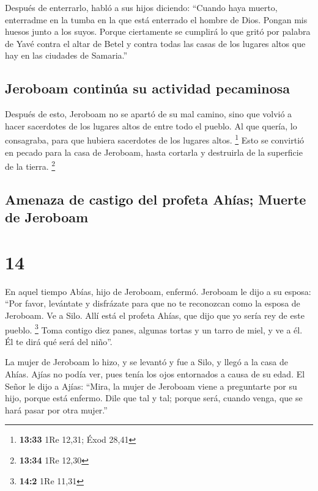  Después de enterrarlo, habló a sus hijos diciendo:
``Cuando haya muerto, enterradme en la tumba en la que está enterrado el
hombre de Dios. Pongan mis huesos junto a los suyos. 
Porque ciertamente se cumplirá lo que gritó por palabra de Yavé contra
el altar de Betel y contra todas las casas de los lugares altos que hay
en las ciudades de Samaria.''

\hypertarget{jeroboam-continuxfaa-su-actividad-pecaminosa}{%
\subsection{Jeroboam continúa su actividad
pecaminosa}\label{jeroboam-continuxfaa-su-actividad-pecaminosa}}

 Después de esto, Jeroboam no se apartó de su mal camino,
sino que volvió a hacer sacerdotes de los lugares altos de entre todo el
pueblo. Al que quería, lo consagraba, para que hubiera sacerdotes de los
lugares altos. \footnote{\textbf{13:33} 1Re 12,31; Éxod 28,41}
 Esto se convirtió en pecado para la casa de Jeroboam,
hasta cortarla y destruirla de la superficie de la tierra. \footnote{\textbf{13:34}
  1Re 12,30}

\hypertarget{amenaza-de-castigo-del-profeta-ahuxedas-muerte-de-jeroboam}{%
\subsection{Amenaza de castigo del profeta Ahías; Muerte de
Jeroboam}\label{amenaza-de-castigo-del-profeta-ahuxedas-muerte-de-jeroboam}}

\hypertarget{section-13}{%
\section{14}\label{section-13}}

 En aquel tiempo Abías, hijo de Jeroboam, enfermó.
 Jeroboam le dijo a su esposa: ``Por favor, levántate y
disfrázate para que no te reconozcan como la esposa de Jeroboam. Ve a
Silo. Allí está el profeta Ahías, que dijo que yo sería rey de este
pueblo. \footnote{\textbf{14:2} 1Re 11,31}  Toma contigo
diez panes, algunas tortas y un tarro de miel, y ve a él. Él te dirá qué
será del niño''.

 La mujer de Jeroboam lo hizo, y se levantó y fue a Silo,
y llegó a la casa de Ahías. Ajías no podía ver, pues tenía los ojos
entornados a causa de su edad.  El Señor le dijo a Ajías:
``Mira, la mujer de Jeroboam viene a preguntarte por su hijo, porque
está enfermo. Dile que tal y tal; porque será, cuando venga, que se hará
pasar por otra mujer.''

